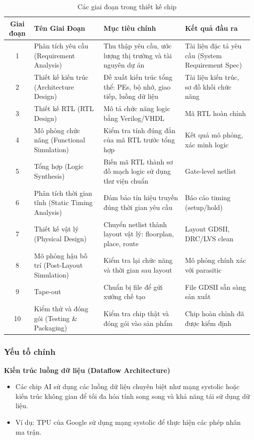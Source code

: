 \documentclass[a4paper]{article}
\begin{document}
\begin{table}[H]
    \centering
    \renewcommand{\arraystretch}{1.3} %
    \begin{tabular}{|c|p{4cm}|p{5cm}|p{4cm}|}
        \hline
        \textbf{Giai đoạn} & \textbf{Tên Giai Đoạn} & \textbf{Mục tiêu chính} & \textbf{Kết quả đầu ra} \\
        \hline
        1 & Phân tích yêu cầu (Requirement Analysis) & Thu thập yêu cầu, ước lượng thị trường và tài nguyên dự án & Tài liệu đặc tả yêu cầu (System Requirement Spec) \\
        \hline
        2 & Thiết kế kiến trúc (Architecture Design) & Đề xuất kiến trúc tổng thể: PEs, bộ nhớ, giao tiếp, luồng dữ liệu & Tài liệu kiến trúc, sơ đồ khối chức năng \\
        \hline
        3 & Thiết kế RTL (RTL Design) & Mô tả chức năng logic bằng Verilog/VHDL & Mã RTL hoàn chỉnh \\
        \hline
        4 & Mô phỏng chức năng (Functional Simulation) & Kiểm tra tính đúng đắn của mã RTL trước tổng hợp & Kết quả mô phỏng, xác minh logic \\
        \hline
        5 & Tổng hợp (Logic Synthesis) & Biến mã RTL thành sơ đồ mạch logic sử dụng thư viện chuẩn & Gate-level netlist \\
        \hline
        6 & Phân tích thời gian tĩnh (Static Timing Analysis) & Đảm bảo tín hiệu truyền đúng thời gian yêu cầu & Báo cáo timing (setup/hold) \\
        \hline
        7 & Thiết kế vật lý (Physical Design) & Chuyển netlist thành layout vật lý: floorplan, place, route & Layout GDSII, DRC/LVS clean \\
        \hline
        8 & Mô phỏng hậu bố trí (Post-Layout Simulation) & Kiểm tra lại chức năng và thời gian sau layout & Mô phỏng chính xác với parasitic \\
        \hline
        9 & Tape-out & Chuẩn bị file để gửi xưởng chế tạo & File GDSII sẵn sàng sản xuất \\
        \hline
        10 & Kiểm thử và đóng gói (Testing \& Packaging) & Kiểm tra chip thật và đóng gói vào sản phẩm & Chip hoàn chỉnh đã được kiểm định \\
        \hline
    \end{tabular}
    \caption{Các giai đoạn trong thiết kế chip}
    \label{tab:chip_design_stages}
\end{table}

\subsubsection{Yếu tố chính}
\textbf{Kiến trúc luồng dữ liệu (Dataflow Architecture)}
\begin{itemize}
    \item Các chip AI sử dụng các luồng dữ liệu chuyên biệt như mạng systolic hoặc kiến trúc không gian để tối đa hóa tính song song và khả năng tái sử dụng dữ liệu.
    \item Ví dụ: TPU của Google sử dụng mạng systolic để thực hiện các phép nhân ma trận.
\end{itemize}
\end{document}
